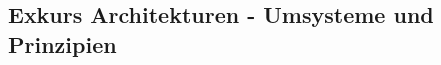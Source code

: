 
\begin{flushleft}
    \section{Exkurs Architekturen - Umsysteme und Prinzipien}
    
    
\end{flushleft}